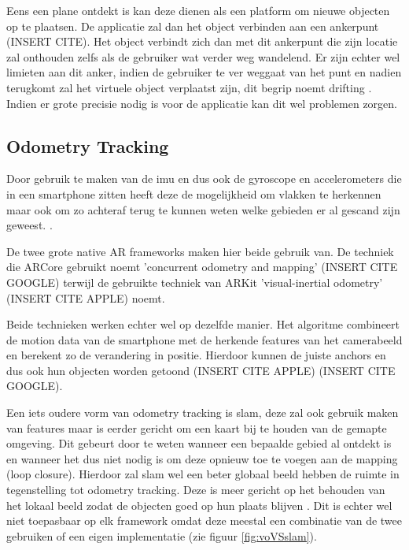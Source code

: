 Eens een plane ontdekt is kan deze dienen als een platform om nieuwe objecten op te plaatsen. De applicatie zal dan het object verbinden aan een ankerpunt (INSERT CITE). Het object verbindt zich dan met dit ankerpunt die zijn locatie zal onthouden zelfs als de gebruiker wat verder weg wandelend. Er zijn echter wel limieten aan dit anker, indien de gebruiker te ver weggaat van het punt en nadien terugkomt zal het virtuele object verplaatst zijn, dit begrip noemt drifting \autocite{You1999}. Indien er grote precisie nodig is voor de applicatie kan dit wel problemen zorgen.

\subsection{Odometry Tracking}

Door gebruik te maken van de \acrshort{imu} en dus ook de gyroscope en accelerometers die in een smartphone zitten heeft deze de mogelijkheid om vlakken te herkennen maar ook om zo achteraf terug te kunnen weten welke gebieden er al gescand zijn geweest. \autocite{Leutenegger2015}.

De twee grote native AR frameworks maken hier beide gebruik van. De techniek die ARCore gebruikt noemt 'concurrent odometry and mapping' (INSERT CITE GOOGLE) terwijl de gebruikte techniek van ARKit 'visual-inertial odometry' (INSERT CITE APPLE) noemt. 

Beide technieken werken echter wel op dezelfde manier. Het algoritme combineert de motion data van de smartphone met de herkende features van het camerabeeld en berekent zo de verandering in positie. Hierdoor kunnen de juiste anchors en dus ook hun objecten worden getoond (INSERT CITE APPLE) (INSERT CITE GOOGLE).

Een iets oudere vorm van odometry tracking is \acrfull{slam}, deze zal ook gebruik maken van features maar is eerder gericht om een kaart bij te houden van de gemapte omgeving. Dit gebeurt door te weten wanneer een bepaalde gebied al ontdekt is en wanneer het dus niet nodig is om deze opnieuw toe te voegen aan de mapping (loop closure). Hierdoor zal \acrshort{slam} wel een beter globaal beeld hebben de ruimte in tegenstelling tot odometry tracking. Deze is meer gericht op het behouden van het lokaal beeld zodat de objecten goed op hun plaats blijven \autocite{Yousif2015}. Dit is echter wel niet toepasbaar op elk framework omdat deze meestal een combinatie van de twee gebruiken of een eigen implementatie (zie figuur \ref{fig:voVSslam}).

